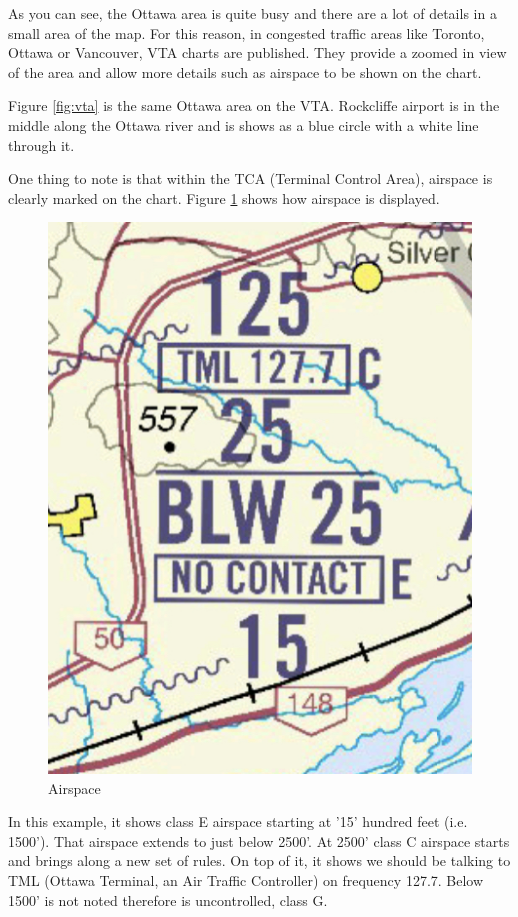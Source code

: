 \documentclass[12pt,letterpaper]{article}
\begin{document}
        As you can see, the Ottawa area is quite busy and there are a lot of details in a small area of the map. For this reason, in congested traffic areas like Toronto, Ottawa or Vancouver, VTA charts are published. They provide a zoomed in view of the area and allow more details such as airspace to be shown on the chart.
        
        Figure \ref{fig:vta} is the same Ottawa area on the VTA. Rockcliffe airport is in the middle along the Ottawa river and is shows as a blue circle with a white line through it.
        
        One thing to note is that within the TCA (Terminal Control Area), airspace is clearly marked on the chart. Figure \ref{fig:airspace} shows how airspace is displayed. 
        
        \begin{figure}[h]
          \begin{center}
            \includegraphics[scale=0.25]{airspace.jpeg}
          \end{center}
          \caption{Airspace}
          \label{fig:airspace}
        \end{figure}

        In this example, it shows class E airspace starting at '15' hundred feet (i.e. 1500'). That airspace extends to just below 2500'. At 2500' class C airspace starts and brings along a new set of rules. On top of it, it shows we should be talking to TML (Ottawa Terminal, an Air Traffic Controller) on frequency 127.7. Below 1500' is not noted therefore is uncontrolled, class G.
        
\end{document}
